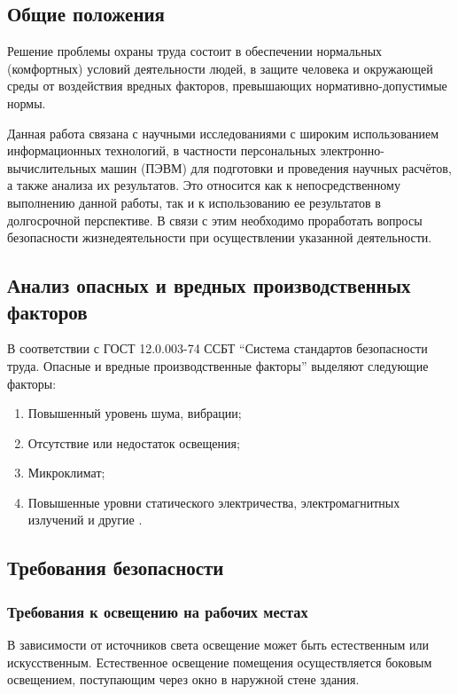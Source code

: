 \subsection{Общие положения}
Решение проблемы охраны труда состоит в обеспечении нормальных (комфортных) условий деятельности людей, в защите человека и окружающей среды от воздействия вредных факторов, превышающих нормативно-допустимые нормы.

Данная работа связана с научными исследованиями с широким использованием информационных технологий, в частности персональных электронно-вычислительных машин (ПЭВМ) для подготовки и проведения научных расчётов, а также анализа их результатов. Это относится как к непосредственному выполнению данной работы, так и к использованию ее результатов в долгосрочной перспективе. В связи с этим необходимо проработать вопросы безопасности жизнедеятельности при осуществлении указанной деятельности.

\subsection{Анализ опасных и вредных производственных факторов}
В соответствии с ГОСТ 12.0.003-74 ССБТ ``Система стандартов безопасности труда. Опасные и вредные производственные факторы'' выделяют следующие факторы:

\begin{enumerate}
  \item Повышенный уровень шума, вибрации;
  \item Отсутствие или недостаток освещения;
  \item Микроклимат;
  \item Повышенные уровни статического электричества, электромагнитных излучений и другие \cite{bhzd_1}.
\end{enumerate}

\subsection{Требования безопасности}
\subsubsection{Требования к освещению на рабочих местах}

В зависимости от источников света освещение может быть естественным или искусственным. Естественное освещение помещения осуществляется боковым освещением, поступающим через окно в наружной стене здания.

